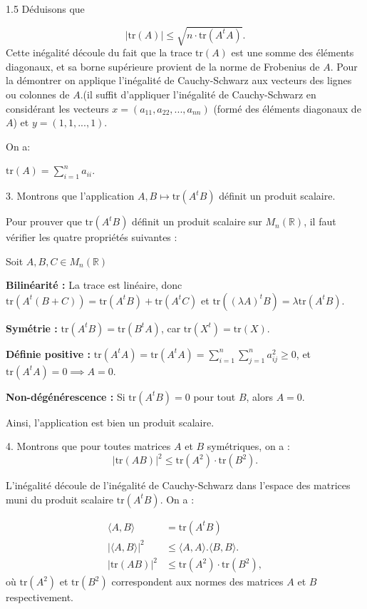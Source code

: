 \documentclass[12pt]{article}
\begin{document}
\begin{spacing}{1.5}
\medskip
Déduisons que

\[
|\text{tr}(A)| \leq \sqrt{n \cdot \text{tr}(A^t A)}.
\]
Cette inégalité découle du fait que la trace $\text{tr}(A)$ est une somme des éléments diagonaux, et sa borne supérieure provient de la norme de Frobenius de $A$. Pour la démontrer on applique l'inégalité de Cauchy-Schwarz aux vecteurs des lignes ou colonnes de $A$.(il suffit d'appliquer l'inégalité de Cauchy-Schwarz en considérant les vecteurs $x=(a_{11}, a_{22},...,a_{nn})$ (formé des éléments diagonaux de $A$) et $y=(1,1,...,1)$.


On a:

$\text{tr}(A)=\sum_{i=1}^na_{ii}$.






3. Montrons que l'application $A, B \mapsto \text{tr}(A^t B)$ définit un produit scalaire.

Pour prouver que $\text{tr}(A^t B)$ définit un produit scalaire sur $M_n(\mathbb{R})$, il faut vérifier les quatre propriétés suivantes :

Soit $A,B,C\in M_n(\mathbb{R})$


     \textbf{Bilinéarité :} La trace est linéaire, donc $\text{tr}(A^t (B + C)) = \text{tr}(A^t B) + \text{tr}(A^t C)$ et $\text{tr}((\lambda A)^t B) = \lambda \text{tr}(A^t B)$.
     
     \textbf{Symétrie :} $\text{tr}(A^t B) = \text{tr}(B^t A)$, car $\text{tr}(X^t) = \text{tr}(X)$.
     
     \textbf{Définie positive :} $\text{tr}(A^t A)=\text{tr}(A^t A) = \sum_{i=1}^n \sum_{j=1}^n a_{ij}^2 \geq 0$, et $\text{tr}(A^t A) = 0 \implies A = 0$.
     
     \textbf{Non-dégénérescence :} Si $\text{tr}(A^t B) = 0$ pour tout $B$, alors $A = 0$.

Ainsi, l'application est bien un produit scalaire.

4. Montrons que pour toutes matrices $A$ et $B$ symétriques, on a :
\[
|\text{tr}(AB)|^2 \leq \text{tr}(A^2) \cdot \text{tr}(B^2).
\]

L'inégalité découle de l'inégalité de Cauchy-Schwarz dans l'espace des matrices muni du produit scalaire $\text{tr}(A^t B)$. On a :


\begin{align*}
\langle A,B\rangle &=\text{tr}(A^tB)\\
\vert\langle A,B\rangle\vert^2 &\leq \langle A,A\rangle.\langle B,B\rangle.\\
|\text{tr}(AB)|^2 &\leq \text{tr}(A^2) \cdot \text{tr}(B^2),
\end{align*}
où $\text{tr}(A^2)$ et $\text{tr}(B^2)$ correspondent aux normes des matrices $A$ et $B$ respectivement.



\end{spacing}
\end{document}
